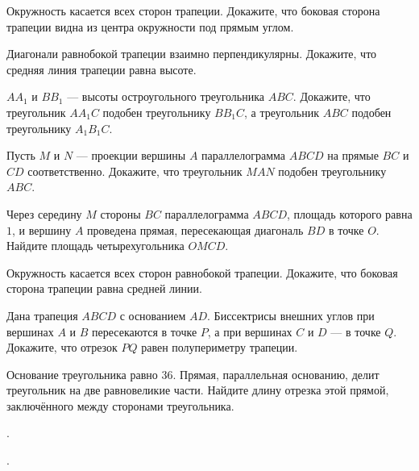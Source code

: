 \begin{class}[number=6]
	\begin{listofex}
		\item Окружность касается всех сторон трапеции. Докажите, что боковая сторона трапеции видна из центра окружности под прямым углом.
		\item Диагонали равнобокой трапеции взаимно перпендикулярны. Докажите, что средняя линия трапеции равна высоте.
		\item \( AA_1 \) и \( BB_1 \) --- высоты остроугольного треугольника \( ABC \). Докажите, что треугольник \( AA_1C \) подобен треугольнику \( BB_1C \), а треугольник \( ABC \) подобен треугольнику \( A_1B_1C \).
		\item Пусть \( M \) и \( N \) --- проекции вершины \( A \) параллелограмма \( ABCD \) на прямые \( BC \) и \( CD \) соответственно. Докажите, что треугольник \( MAN \) подобен треугольнику \( ABC \).
		\item Через середину \( M \) стороны \( BC \) параллелограмма \( ABCD \), площадь которого равна \( 1 \), и вершину \( A \) проведена прямая, пересекающая диагональ \( BD \) в точке \( O \). Найдите площадь четырехугольника \( OMCD \).
	\end{listofex}
\end{class}

\begin{homework}[number=3]
	\begin{listofex}
		\item Окружность касается всех сторон равнобокой трапеции. Докажите, что боковая сторона трапеции равна средней линии.
		\item Дана трапеция \( ABCD \) с основанием \( AD \). Биссектрисы внешних углов при вершинах \( A \) и \( B \) пересекаются в точке \( P \), а при вершинах \( C \) и \( D \) --- в точке \( Q \). Докажите, что отрезок \( PQ \) равен полупериметру трапеции.
		\item Основание треугольника равно \( 36 \). Прямая, параллельная основанию, делит треугольник на две равновеликие части. Найдите длину отрезка этой прямой, заключённого между сторонами треугольника.
	\end{listofex}
\end{homework}

\begin{class}[number=7]
	\begin{listofex}
		\item.
	\end{listofex}
\end{class}

\begin{exam}
	\begin{listofex}
		\item .
	\end{listofex}
\end{exam}
